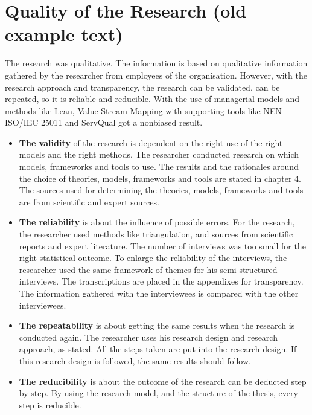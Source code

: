 \section{Quality of the Research (old example text)}
\label{sec:quality-of-the-research}
The research was qualitative. The information is based on qualitative information gathered by the researcher
from employees of the organisation. However, with the research approach and transparency, the research can
be validated, can be repeated, so it is reliable and reducible. With the use of managerial models and methods
like Lean, Value Stream Mapping with supporting tools like NEN-ISO/IEC 25011 and ServQual got a nonbiased
result.\\
\begin{itemize}
	\item{\textbf{The validity} of the research is dependent on the right use of the right models and the right methods. The researcher conducted research on which models, frameworks and tools to use. The results and the rationales around the choice of theories, models, frameworks and tools are stated in chapter 4. The sources used for determining the theories, models, frameworks and tools are from scientific and expert sources.}
	\item{\textbf{The reliability} is about the influence of possible errors. For the research, the researcher used methods like triangulation, and sources from scientific reports and expert literature. The number of interviews was too small for the right statistical outcome. To enlarge the reliability of the interviews, the researcher used the same framework of themes for his semi-structured interviews. The transcriptions are placed in the appendixes for transparency. The information gathered with the interviewees is compared with the other interviewees.}
	\item{\textbf{The repeatability} is about getting the same results when the research is conducted again. The researcher uses his research design and research approach, as stated. All the steps taken are put into the research design. If this research design is followed, the same results should follow.}
	\item{\textbf{The reducibility} is about the outcome of the research can be deducted step by step. By using the research model, and the structure of the thesis, every step is reducible.}
\end{itemize}
